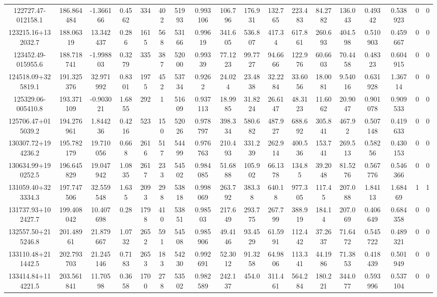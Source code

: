 \begin{table}
\begin{tabular}{cccccccccccccccccc}
122727.47-012158.1 & 186.864484 & -1.366166 & 0.4562 & 334 & 402 & 51993 & 0.993106 & 106.796 & 176.931 & 132.765 & 223.483 & 84.2782 & 136.043 & 0.49342 & 0.538923 & 0 & 0 \\
123215.16+132032.7 & 188.06319 & 13.342437 & 0.286 & 1615 & 568 & 53166 & 0.99619 & 341.605 & 536.807 & 417.34 & 617.861 & 260.693 & 404.598 & 0.510903 & 0.459667 & 0 & 0 \\
123452.49-015955.6 & 188.718741 & -1.998803 & 0.3279 & 335 & 387 & 52000 & 0.99339 & 77.1223 & 99.7727 & 94.6666 & 122.976 & 60.6603 & 70.4458 & 0.48323 & 0.604915 & 0 & 0 \\
124518.09+325819.1 & 191.325376 & 32.971992 & 0.8301 & 1975 & 452 & 53734 & 0.9262 & 24.024 & 23.4838 & 32.2284 & 33.6056 & 18.0081 & 9.54016 & 0.631928 & 1.36714 & 0 & 0 \\
125329.06-005410.8 & 193.371109 & -0.903021 & 1.6855 & 292 & 1 & 51609 & 0.937113 & 18.9985 & 31.8224 & 26.6147 & 48.3123 & 11.6062 & 20.9047 & 0.901078 & 0.909533 & 0 & 0 \\
125706.47+015039.2 & 194.276961 & 1.844236 & 0.4216 & 523 & 150 & 52026 & 0.978797 & 398.334 & 580.682 & 487.927 & 688.692 & 305.841 & 467.92 & 0.507148 & 0.419633 & 0 & 0 \\
130307.72+194236.2 & 195.782179 & 19.710056 & 0.668 & 2616 & 517 & 54499 & 0.976763 & 210.493 & 331.239 & 262.914 & 400.536 & 153.741 & 269.513 & 0.58256 & 0.430153 & 0 & 0 \\
130634.99+190252.5 & 196.645829 & 19.047942 & 1.0835 & 2617 & 233 & 54502 & 0.984085 & 51.6888 & 105.902 & 66.1378 & 134.85 & 39.2048 & 81.5276 & 0.567776 & 0.546366 & 0 & 0 \\
131059.40+323334.3 & 197.747506 & 32.559548 & 1.635 & 2093 & 298 & 53818 & 0.998069 & 263.792 & 383.38 & 640.18 & 977.305 & 117.45 & 207.088 & 1.84113 & 1.68469 & 1 & 1 \\
131737.93+102427.7 & 199.408042 & 10.407698 & 0.28 & 1798 & 410 & 53851 & 0.98503 & 217.649 & 293.775 & 267.799 & 388.919 & 184.14 & 207.069 & 0.406649 & 0.684358 & 0 & 0 \\
132557.50+215246.8 & 201.48961 & 21.879667 & 1.0732 & 2652 & 591 & 54508 & 0.985906 & 49.4146 & 93.4529 & 61.5991 & 112.442 & 37.2637 & 71.6472 & 0.545722 & 0.489321 & 0 & 0 \\
133110.48+211442.5 & 202.793703 & 21.245146 & 0.7183 & 2653 & 183 & 54230 & 0.992691 & 52.3012 & 91.3258 & 64.9806 & 113.341 & 44.1986 & 71.3853 & 0.418439 & 0.501949 & 0 & 0 \\
133414.84+114221.5 & 203.561841 & 11.70598 & 0.3658 & 1700 & 278 & 53502 & 0.982589 & 242.137 & 454.0 & 311.461 & 564.284 & 180.221 & 344.077 & 0.593996 & 0.537104 & 0 & 0 \\

\end{tabular}
\end{table}

